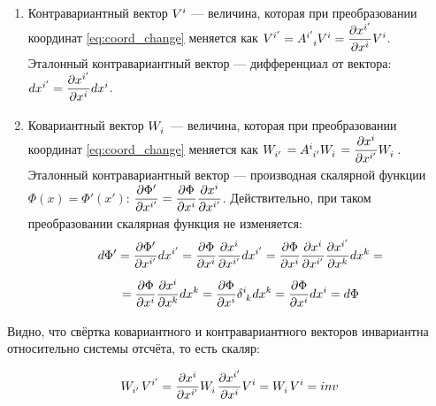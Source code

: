 \documentclass{article}
\begin{document}
\begin{enumerate}
    \item Контравариантный вектор $\tensor{V}{^i}$ --- величина, которая при преобразовании координат \eqref{eq:coord_change} меняется как $\tensor{V}{^{i'}}=\tensor{A}{^{i'}_i}\tensor{V}{^i}=\dfrac{\partial \tensor{x}{^{i'}}}{\partial \tensor{x}{^i}}\tensor{V}{^i}$.
    Эталонный контравариантный вектор --- дифференциал от вектора: $d\tensor{x}{^{i'}}=\dfrac{\partial \tensor{x}{^{i'}}}{\partial\tensor{x}{^i}} d\tensor{x}{^i}$.
    \item Ковариантный вектор $\tensor{W}{_i}$ --- величина, которая при преобразовании координат \eqref{eq:coord_change} меняется как $\tensor{W}{_{i'}}=\tensor{A}{^i_{i'}}\tensor{W}{_i}=\dfrac{\partial\tensor{x}{^i}}{\partial\tensor{x}{^{i'}}}\tensor{W}{_i}$.
    Эталонный контравариантный вектор --- производная скалярной функции $\Phi(x)=\Phi'(x')$: $\dfrac{\partial\Phi'}{\partial\tensor{x}{^{i'}}}=\dfrac{\partial\Phi}{\partial\tensor{x}{^i}}\dfrac{\partial\tensor{x}{^i}}{\partial\tensor{x}{^{i'}}}$. Действительно, при таком преобразовании скалярная функция не изменяется:
    \begin{equation*}
        d\Phi'=\dfrac{\partial\Phi'}{\partial\tensor{x}{^{i'}}}d\tensor{x}{^{i'}}=\dfrac{\partial\Phi}{\partial\tensor{x}{^i}}\dfrac{\partial\tensor{x}{^i}}{\partial\tensor{x}{^{i'}}}d\tensor{x}{^{i'}}=\dfrac{\partial\Phi}{\partial\tensor{x}{^i}}\dfrac{\partial\tensor{x}{^i}}{\partial\tensor{x}{^{i'}}}\dfrac{\partial\tensor{x}{^{i'}}}{\partial\tensor{x}{^{k}}}d\tensor{x}{^k}=
    \end{equation*}
    \begin{equation*}
        =\dfrac{\partial\Phi}{\partial\tensor{x}{^i}}\dfrac{\partial\tensor{x}{^i}}{\partial\tensor{x}{^{k}}}d\tensor{x}{^k}=\dfrac{\partial\Phi}{\partial\tensor{x}{^i}}\tensor{\delta}{^i_k}d\tensor{x}{^k}=\dfrac{\partial\Phi}{\partial\tensor{x}{^i}}d\tensor{x}{^i}=d\Phi
    \end{equation*}
\end{enumerate}

Видно, что свёртка ковариантного и контравариантного векторов инвариантна относительно системы отсчёта, то есть скаляр:

\begin{equation*}
    \tensor{W}{_{i'}}\tensor{V}{^{i'}}=\dfrac{\partial\tensor{x}{^i}}{\partial\tensor{x}{^{i'}}}\tensor{W}{_i}\dfrac{\partial \tensor{x}{^{i'}}}{\partial \tensor{x}{^i}}\tensor{V}{^i}=\tensor{W}{_i}\tensor{V}{^i}=inv
\end{equation*}
\end{document}
